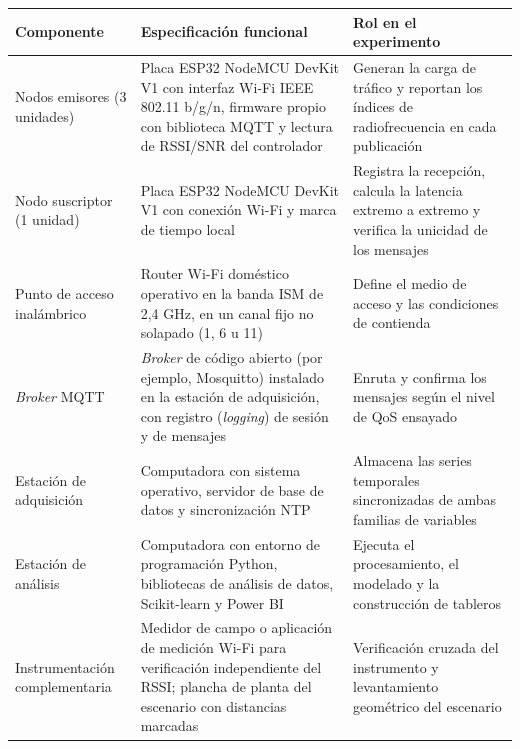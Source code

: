 \documentclass[
  12pt,
]{article}
\newcounter{none} %
\begin{document}
{\def\LTcaptype{none} %
\begin{longtable}[]{@{}
  >{\raggedright\arraybackslash}p{}
  >{\raggedright\arraybackslash}p{}
  >{\raggedright\arraybackslash}p{}@{}}
\toprule\noalign{}
\begin{minipage}[b]{\linewidth}\raggedright
Componente
\end{minipage} & \begin{minipage}[b]{\linewidth}\raggedright
Especificación funcional
\end{minipage} & \begin{minipage}[b]{\linewidth}\raggedright
Rol en el experimento
\end{minipage} \\
\midrule\noalign{}
\endhead
\bottomrule\noalign{}
\endlastfoot
Nodos emisores (3 unidades) & Placa ESP32 NodeMCU DevKit V1 con interfaz
Wi-Fi IEEE 802.11 b/g/n, firmware propio con biblioteca MQTT y lectura
de RSSI/SNR del controlador & Generan la carga de tráfico y reportan los
índices de radiofrecuencia en cada publicación \\
Nodo suscriptor (1 unidad) & Placa ESP32 NodeMCU DevKit V1 con conexión
Wi-Fi y marca de tiempo local & Registra la recepción, calcula la
latencia extremo a extremo y verifica la unicidad de los mensajes \\
Punto de acceso inalámbrico & Router Wi-Fi doméstico operativo en la
banda ISM de 2,4 GHz, en un canal fijo no solapado (1, 6 u 11) & Define
el medio de acceso y las condiciones de contienda \\
\emph{Broker} MQTT & \emph{Broker} de código abierto (por ejemplo,
Mosquitto) instalado en la estación de adquisición, con registro
(\emph{logging}) de sesión y de mensajes & Enruta y confirma los
mensajes según el nivel de QoS ensayado \\
Estación de adquisición & Computadora con sistema operativo, servidor de
base de datos y sincronización NTP & Almacena las series temporales
sincronizadas de ambas familias de variables \\
Estación de análisis & Computadora con entorno de programación Python,
bibliotecas de análisis de datos, Scikit-learn y Power BI & Ejecuta el
procesamiento, el modelado y la construcción de tableros \\
Instrumentación complementaria & Medidor de campo o aplicación de
medición Wi-Fi para verificación independiente del RSSI; plancha de
planta del escenario con distancias marcadas & Verificación cruzada del
instrumento y levantamiento geométrico del escenario \\
\end{longtable}
}
\end{document}
